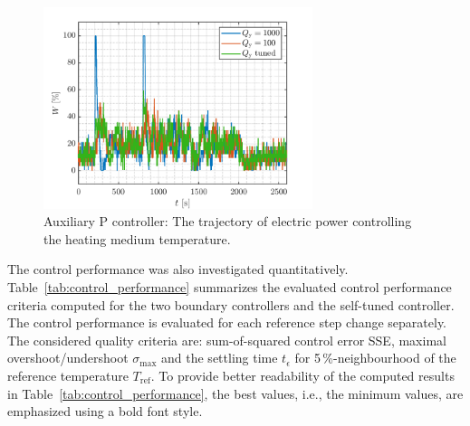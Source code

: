 \documentclass[preprint,12pt]{elsarticle}
\begin{document}
\begin{figure}
	\begin{center}
		\includegraphics[width=0.7\textwidth]{images/W}
		\caption{Auxiliary P controller: The trajectory of electric power controlling the heating medium temperature.}
		\label{fig:W}
	\end{center}
\end{figure}

The control performance was also investigated quantitatively. Table~\ref{tab:control_performance} summarizes the evaluated control performance criteria computed for the two boundary controllers and the self-tuned controller. The control performance is evaluated for each reference step change separately. The considered quality criteria are: sum-of-squared control error SSE, maximal overshoot/undershoot $\sigma_{\mathrm{max}}$ and the settling time $t_{\epsilon}$ for 5\,\%-neighbourhood of the reference temperature $T_{\mathrm{ref}}$. To provide better readability of the computed results in Table~\ref{tab:control_performance}, the best values, i.e., the minimum values, are emphasized using a bold font style. 
\end{document}
